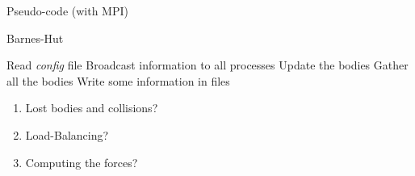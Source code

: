 \documentclass[10pt]{beamer}
\begin{document}
\begin{frame}[fragile]{Pseudo-code (with MPI)}
\begin{algorithm}[H]
\caption{Barnes-Hut}\label{bh}
\begin{algorithmic}[1]
\State Read {\it config} file
\State Broadcast information to all processes
 {
}
\State Update the bodies
\State Gather all the bodies
\State Write some information in files
\EndWhile
\end{algorithmic}
\end{algorithm}
\begin{enumerate}
\item {\color{red} Lost bodies and collisions?}
\item {\color{mygreen} Load-Balancing?}
\item {\color{blue} Computing the forces?} 
\end{enumerate}
\end{frame}
\end{document}
